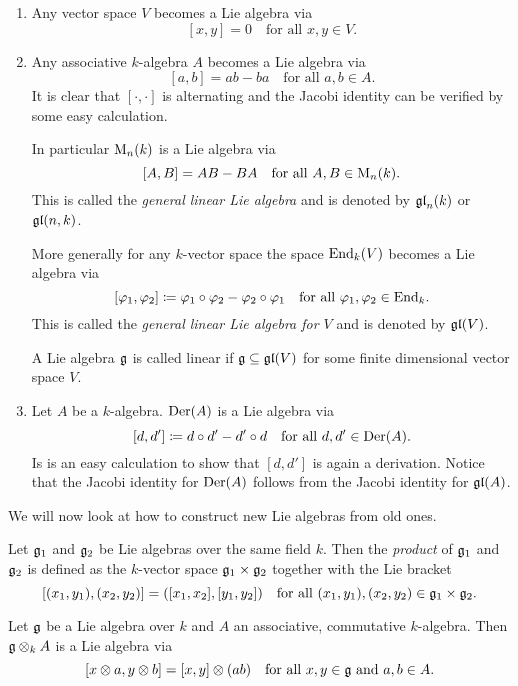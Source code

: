 \begin{expls}
 \begin{enumerate}
  \item
   Any vector space $V$ becomes a Lie algebra via
   \[
    [x,y] = 0 \quad \text{for all $x,y \in V$}.
   \]
  \item
   Any associative $k$-algebra $A$ becomes a Lie algebra via
   \[
    [a,b] = ab-ba \quad \text{for all $a,b \in A$}.
   \]
   It is clear that $[\cdot, \cdot]$ is alternating and the Jacobi identity can be verified by some easy calculation.
   
   In particular $\operatorname{M}_n(k)$ is a Lie algebra via
   \[
    [A,B] = AB-BA \quad \text{for all $A,B \in \operatorname{M}_n(k)$}.
   \]
   This is called the \emph{general linear Lie algebra} and is denoted by $\mathfrak{gl}_n(k)$ or $\mathfrak{gl}(n,k)$.
   
   More generally for any $k$-vector space the space $\operatorname{End}_k(V)$ becomes a Lie algebra via
   \[
    [\varphi_1, \varphi_2] \coloneqq \varphi_1 \circ \varphi_2 - \varphi_2 \circ \varphi_1
    \quad
    \text{for all $\varphi_1, \varphi_2 \in \operatorname{End}_k$}.
   \]
   This is called the \emph{general linear Lie algebra for $V$} and is denoted by $\mathfrak{gl}(V)$.
   
   A Lie algebra $\mathfrak{g}$ is called linear if $\mathfrak{g} \subseteq \mathfrak{gl}(V)$ for some finite dimensional vector space $V$.
  \item
   Let $A$ be a $k$-algebra. $\operatorname{Der}(A)$ is a Lie algebra via
   \[
    [d, d'] \coloneqq d \circ d' - d' \circ d
    \quad 
    \text{for all $d, d' \in \operatorname{Der}(A)$}.
   \]
   Is is an easy calculation to show that $[d,d']$ is again a derivation. Notice that the Jacobi identity for $\operatorname{Der}(A)$ follows from the Jacobi identity for $\mathfrak{gl}(A)$.
 \end{enumerate}
\end{expls}


We will now look at how to construct new Lie algebras from old ones.


\begin{defi}
 Let $\mathfrak{g}_1$ and $\mathfrak{g}_2$ be Lie algebras over the same field $k$. Then the \emph{product} of $\mathfrak{g}_1$ and $\mathfrak{g}_2$ is defined as the $k$-vector space $\mathfrak{g}_1 \times \mathfrak{g}_2$ together with the Lie bracket
 \[
  [(x_1, y_1), (x_2, y_2)]
  = ([x_1, x_2], [y_1, y_2])
  \quad
  \text{for all $(x_1, y_1), (x_2, y_2) \in \mathfrak{g}_1 \times \mathfrak{g}_2$}.
 \]
\end{defi}


Let $\mathfrak{g}$ be a Lie algebra over $k$ and $A$ an associative, commutative $k$-algebra. Then $\mathfrak{g} \otimes_k A$ is a Lie algebra via
\[
 [x \otimes a, y \otimes b] = [x,y] \otimes (ab)
 \quad
 \text{for all $x,y \in \mathfrak{g}$ and $a,b \in A$}.
\]


